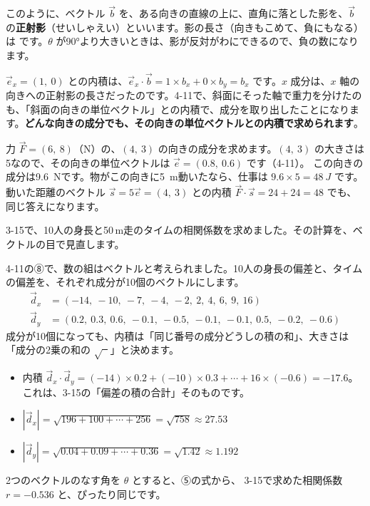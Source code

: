 \par\vspace{4pt}
このように、ベクトル $\vec{b}$ を、ある向きの直線の上に、直角に落とした影を、$\vec{b}$ の\textbf{正射影}（せいしゃえい）といいます。影の長さ（向きもこめて、負にもなる）は
です。$\theta$ が90°より大きいときは、影が反対がわにできるので、負の数になります。

$\vec{e}_x=(1,\ 0)$ との内積は、$\vec{e}_x\cdot\vec{b}=1\times b_x+0\times b_y=b_x$ です。$x$ 成分は、$x$ 軸の向きへの正射影の長さだったのです。4-11で、斜面にそった軸で重力を分けたのも、「斜面の向きの単位ベクトル」との内積で、成分を取り出したことになります。\textbf{どんな向きの成分でも、その向きの単位ベクトルとの内積で求められます}。

力 $\vec{F}=(6,\ 8)$（N）の、$(4,\ 3)$ の向きの成分を求めます。$(4,\ 3)$ の大きさは5なので、その向きの単位ベクトルは $\vec{e}=(0.8,\ 0.6)$ です（4-11）。
この向きの成分は\qty{9.6}{N}です。物がこの向きに\qty{5}{m}動いたなら、仕事は $9.6\times5=\qty{48}{J}$ です。動いた距離のベクトル $\vec{s}=5\vec{e}=(4,\ 3)$ との内積 $\vec{F}\cdot\vec{s}=24+24=48$ でも、同じ答えになります。


\label{bk:4-12:soukan}3-15で、10人の身長と50\,m走のタイムの相関係数を求めました。その計算を、ベクトルの目で見直します。

4-11の⑧で、数の組はベクトルと考えられました。10人の身長の偏差と、タイムの偏差を、それぞれ成分が10個のベクトルにします。
\begin{align*}
\vec{d}_x&=(-14,\ -10,\ -7,\ -4,\ -2,\ 2,\ 4,\ 6,\ 9,\ 16)\\
\vec{d}_y&=(0.2,\ 0.3,\ 0.6,\ -0.1,\ -0.5,\ -0.1,\ -0.1,\ 0.5,\ -0.2,\ -0.6)
\end{align*}
成分が10個になっても、内積は「同じ番号の成分どうしの積の和」、大きさは「成分の2乗の和の $\sqrt{\phantom{x}}$」と決めます。

\begin{itemize}[leftmargin=1.2\zw, itemsep=2pt, topsep=1pt, label={\color{\bkTT}●}]
\item 内積 $\vec{d}_x\cdot\vec{d}_y=(-14)\times0.2+(-10)\times0.3+\cdots+16\times(-0.6)=-17.6$。これは、3-15の「偏差の積の合計」そのものです。
\item $|\vec{d}_x|=\sqrt{196+100+\cdots+256}=\sqrt{758}\approx27.53$
\item $|\vec{d}_y|=\sqrt{0.04+0.09+\cdots+0.36}=\sqrt{1.42}\approx1.192$
\end{itemize}
2つのベクトルのなす角を $\theta$ とすると、⑤の式から、
3-15で求めた相関係数 $r=-0.536$ と、ぴったり同じです。

